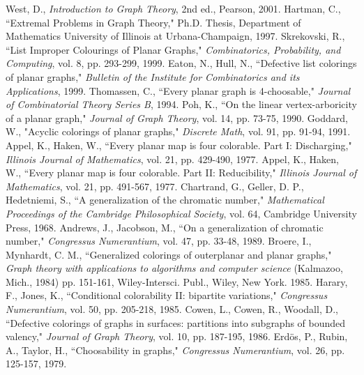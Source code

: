 \documentclass[letterpaper, 12pt]{article}
\theoremstyle{definition}
\theoremstyle{definition}
\theoremstyle{thm}
\theoremstyle{definition}
\begin{document}
\begin{thebibliography}{99}  %
	West, D., \textit{Introduction to Graph Theory},
	2nd ed., Pearson, 2001.
	Hartman, C.,
	``Extremal Problems in Graph Theory," Ph.D. Thesis, Department of
	Mathematics University of Illinois at Urbana-Champaign, 1997.
	Skrekovski, R., ``List Improper Colourings of Planar Graphs,"
	\textit{Combinatorics, Probability, and Computing}, vol. 8, pp. 293-299,
	1999.
	Eaton, N., Hull, N., ``Defective list colorings of planar graphs,"
	\emph{Bulletin of the Institute for Combinatorics and its Applications},
	1999.
	Thomassen, C., ``Every planar graph is 4-choosable,"
	\emph{Journal of Combinatorial Theory Series B}, 1994.
	Poh, K., ``On the linear vertex-arboricity of a planar graph,"
	\emph{Journal of Graph Theory}, vol. 14, pp. 73-75, 1990.
    Goddard, W., "Acyclic colorings of planar graphs," \textit{Discrete Math},
    vol. 91, pp. 91-94, 1991.
	Appel, K., Haken, W., ``Every planar map is four colorable. Part I:
	Discharging," \textit{Illinois Journal of Mathematics}, vol. 21, pp. 429-490,
	1977.
	Appel, K., Haken, W., ``Every planar map is four colorable. Part II:
	Reducibility," \textit{Illinois Journal of Mathematics}, vol. 21, pp.
	491-567, 1977.
	Chartrand, G., Geller, D. P., Hedetniemi, S., ``A generalization of the
	chromatic number," \textit{Mathematical Proceedings of the Cambridge
	Philosophical Society}, vol. 64, Cambridge University Press, 1968.
	Andrews, J., Jacobson, M., ``On a generalization of chromatic number,"
	\textit{Congressus Numerantium}, vol. 47, pp. 33-48, 1989.
	Broere, I., Mynhardt, C. M., ``Generalized colorings of outerplanar and planar
	graphs," \textit{Graph theory with applications to algorithms and computer science}
	(Kalmazoo, Mich., 1984) pp. 151-161, Wiley-Intersci. Publ., Wiley, New York. 1985.
	Harary, F., Jones, K., ``Conditional colorability II: bipartite variations,"
	\textit{Congressus Numerantium}, vol. 50, pp. 205-218, 1985.
	Cowen, L., Cowen, R., Woodall, D., ``Defective colorings of graphs in
	surfaces: partitions into subgraphs of bounded valency,"
	\textit{Journal of Graph Theory}, vol. 10, pp. 187-195, 1986.
	Erd{\"o}s, P., Rubin, A., Taylor, H., ``Choosability in graphs,"
	\textit{Congressus Numerantium}, vol. 26, pp. 125-157, 1979.

\end{thebibliography}
\end{document}
